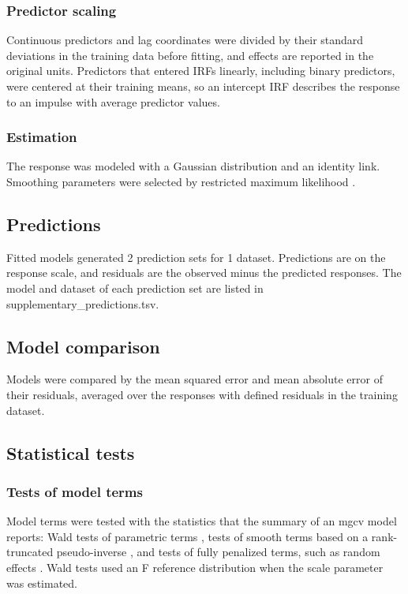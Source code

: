 \subsubsection*{Predictor scaling}

Continuous predictors and lag coordinates were divided by their standard deviations in the training data before fitting, and effects are reported in the original units. Predictors that entered IRFs linearly, including binary predictors, were centered at their training means, so an intercept IRF describes the response to an impulse with average predictor values.

\subsubsection*{Estimation}

The response was modeled with a Gaussian distribution and an identity link. Smoothing parameters were selected by restricted maximum likelihood \citep{wood2011fast}.

\subsection*{Predictions}

Fitted models generated 2 prediction sets for 1 dataset. Predictions are on the response scale, and residuals are the observed minus the predicted responses. The model and dataset of each prediction set are listed in supplementary\_predictions.tsv.

\subsection*{Model comparison}

Models were compared by the mean squared error and mean absolute error of their residuals, averaged over the responses with defined residuals in the training dataset.

\subsection*{Statistical tests}

\subsubsection*{Tests of model terms}

Model terms were tested with the statistics that the summary of an mgcv model reports: Wald tests of parametric terms \citep{wood2017generalized}, tests of smooth terms based on a rank-truncated pseudo-inverse \citep{wood2013pvalues}, and tests of fully penalized terms, such as random effects \citep{wood2013random}. Wald tests used an F reference distribution when the scale parameter was estimated.

